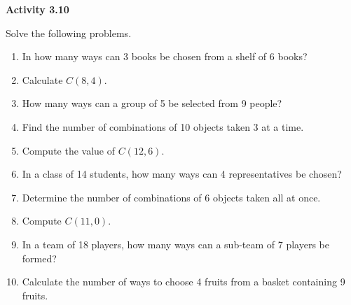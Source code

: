 \vspace{0.3ex}
\noindent\textbf{Activity 3.10}

\vspace{0.2ex}

Solve the following problems. 

\begin{enumerate}[label=\color{blue}\arabic*.]
    \item In how many ways can 3 books be chosen from a shelf of 6 books?
    \item Calculate \(C(8, 4)\).
    \item How many ways can a group of 5 be selected from 9 people?
    \item Find the number of combinations of 10 objects taken 3 at a time.
    \item Compute the value of \(C(12, 6)\).
    \item In a class of 14 students, how many ways can 4 representatives be chosen?
    \item Determine the number of combinations of 6 objects taken all at once.
    \item Compute \(C(11, 0)\).
    \item In a team of 18 players, how many ways can a sub-team of 7 players be formed?
    \item Calculate the number of ways to choose 4 fruits from a basket containing 9 fruits.
\end{enumerate}
